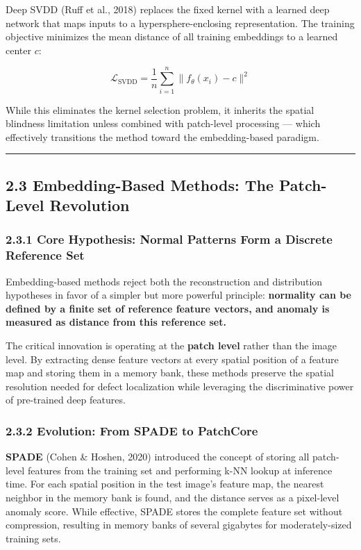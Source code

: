 Deep SVDD (Ruff et al., 2018) replaces the fixed kernel with a learned deep network that maps inputs to a hypersphere-enclosing representation. The training objective minimizes the mean distance of all training embeddings to a learned center \(c\):

\[\mathcal{L}_{\text{SVDD}} = \frac{1}{n} \sum_{i=1}^{n} \| f_\theta(x_i) - c \|^2\]

While this eliminates the kernel selection problem, it inherits the spatial blindness limitation unless combined with patch-level processing --- which effectively transitions the method toward the embedding-based paradigm.

\begin{center}\rule{0.5\linewidth}{0.5pt}\end{center}

\subsection{2.3 Embedding-Based Methods: The Patch-Level Revolution}\label{embedding-based-methods-the-patch-level-revolution}

\subsubsection{2.3.1 Core Hypothesis: Normal Patterns Form a Discrete Reference Set}\label{core-hypothesis-normal-patterns-form-a-discrete-reference-set}

Embedding-based methods reject both the reconstruction and distribution hypotheses in favor of a simpler but more powerful principle: \textbf{normality can be defined by a finite set of reference feature vectors, and anomaly is measured as distance from this reference set.}

The critical innovation is operating at the \textbf{patch level} rather than the image level. By extracting dense feature vectors at every spatial position of a feature map and storing them in a memory bank, these methods preserve the spatial resolution needed for defect localization while leveraging the discriminative power of pre-trained deep features.

\subsubsection{2.3.2 Evolution: From SPADE to PatchCore}\label{evolution-from-spade-to-patchcore}

\textbf{SPADE} (Cohen \& Hoshen, 2020) introduced the concept of storing all patch-level features from the training set and performing k-NN lookup at inference time. For each spatial position in the test image's feature map, the nearest neighbor in the memory bank is found, and the distance serves as a pixel-level anomaly score. While effective, SPADE stores the complete feature set without compression, resulting in memory banks of several gigabytes for moderately-sized training sets.

